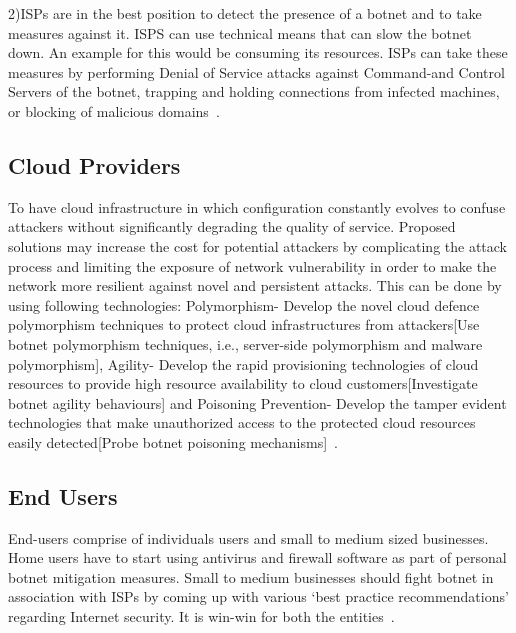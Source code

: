 2)ISPs are in the best position to detect the presence of a botnet and to take measures against it. ISPS can use technical means that can slow the botnet down. An example for this would be consuming its resources. ISPs can take these measures by performing Denial of Service attacks against Command-and Control Servers of the botnet, trapping and holding connections from infected machines, or blocking of malicious domains~\cite{leder2009proactive}. 

\subsection{Cloud Providers}

To have cloud infrastructure in which configuration constantly evolves to confuse attackers without significantly degrading the quality of service. Proposed solutions may increase the cost for potential attackers by complicating the attack process and limiting the exposure of network vulnerability in order to make the network more resilient against novel and persistent attacks. This can be done by using following technologies: Polymorphism- Develop the novel cloud defence polymorphism techniques to protect cloud infrastructures from attackers[Use botnet polymorphism techniques, i.e., server-side polymorphism and malware polymorphism], Agility- Develop the rapid provisioning technologies of cloud resources to provide high resource availability to cloud customers[Investigate botnet agility behaviours] and Poisoning Prevention- Develop the tamper evident technologies that make unauthorized access to the protected cloud resources easily detected[Probe botnet poisoning mechanisms]~\cite{peng2014moving}.

\subsection{End Users}

End-users comprise of individuals users and small to medium sized businesses. Home users have to start using antivirus and firewall software as part of personal botnet mitigation measures. Small to medium businesses should fight botnet in association with ISPs by coming up with various ‘best practice recommendations’ regarding Internet security. It is win-win for both the entities~\cite{asghari2010botnet}.

